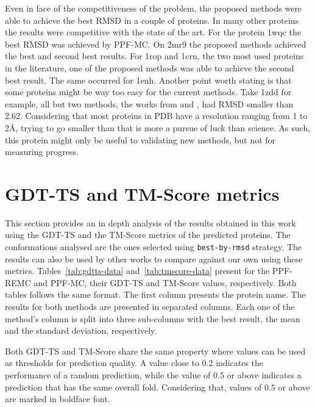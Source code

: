 Even in face of the competitiveness of the problem, the proposed methods were
able to achieve the best RMSD in a couple of proteins. In many other proteins
the results were competitive with the state of the art. For the protein 1wqc
the best RMSD was achieved by PPF-MC. On 2mr9 the proposed methods
achieved the best and second best results. For 1rop and 1crn, the two most used
proteins in the literature, one of the proposed methods was able to achieve
the second best result. The same occurred for 1enh. Another point worth stating
is that some proteins might be way too easy for the current methods. Take 1zdd
for example, all but two methods, the works from 
and , had RMSD smaller than 2.62. Considering that
most proteins in PDB have a resolution ranging from 1 to 2\AA, trying to go
smaller than that is more a pursue of luck than science. As such, this protein
might only be useful to validating new methods, but not for measuring progress.

\section{GDT-TS and TM-Score metrics}
\label{sec:other-metrics}

This section provides an in depth analysis of the results obtained in this
work using the GDT-TS and the TM-Score metrics of the predicted proteins.
The conformations analysed are the ones selected using \texttt{best-by-rmsd} strategy.
The results can also be used by other works to compare against our own using
these metrics. Tables~\ref{tab:gdtts-data} and~\ref{tab:tmscore-data} present
for the PPF-REMC and PPF-MC, their
GDT-TS and TM-Score values, respectively. Both tables follows the same format. The
first column presents the protein name. The results for both methods are
presented in separated columns. Each one of the
method's column is split into three sub-columns with the best result, the mean
and the standard deviation, respectively.

Both GDT-TS and TM-Score share the same property where values can be used as
thresholds for prediction quality. A value close to $0.2$ indicates the performance of
a random prediction, while the value of $0.5$ or above indicates a prediction that has
the same overall fold. Considering that, values of $0.5$ or above are marked
in boldface font.


